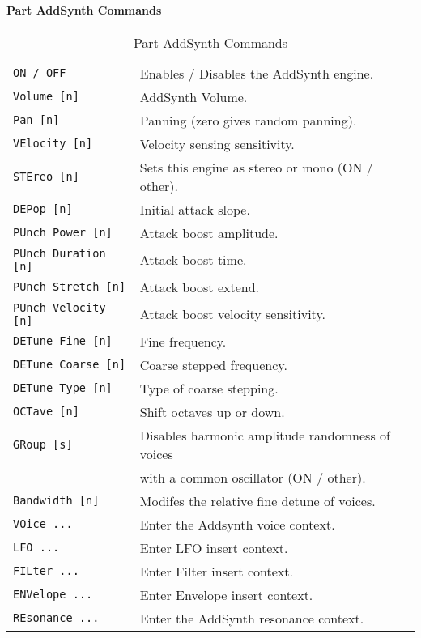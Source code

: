 \paragraph{Part AddSynth Commands}
\label{paragraph:command_line_part_addsynth_commands}
   \begin{table}[H]
      \centering
      \caption{Part AddSynth Commands}
      \label{table:yoshimi_part_addsynth_commands}
      \begin{tabular}{l l}
\texttt{ON / OFF} &
   Enables / Disables the AddSynth engine. \\
\texttt{Volume [n]} &
   AddSynth Volume.  \\
\texttt{Pan [n]} &
   Panning (zero gives random panning).\\
\texttt{VElocity [n]} &
   Velocity sensing sensitivity. \\
\texttt{STEreo [n]} &
   Sets this engine as stereo or mono (ON / other). \\
\texttt{DEPop [n]} &
   Initial attack slope.   \\
\texttt{PUnch Power [n]} &
   Attack boost amplitude. \\
\texttt{PUnch Duration [n]} &
   Attack boost time.   \\
\texttt{PUnch Stretch [n]} &
   Attack boost extend. \\
\texttt{PUnch Velocity [n]} &
   Attack boost velocity sensitivity.  \\
\texttt{DETune Fine [n]} &
   Fine frequency.   \\
\texttt{DETune Coarse [n]} &
   Coarse stepped frequency.  \\
\texttt{DETune Type [n]} &
   Type of coarse stepping.   \\
\texttt{OCTave [n]} &
   Shift octaves up or down.  \\
\texttt{GRoup [s]} &
   Disables harmonic amplitude randomness of voices \\
\texttt{ } &
             with a common oscillator (ON / other). \\
\texttt{Bandwidth [n]} &
   Modifes the relative fine detune of voices. \\
\texttt{VOice ...} &
   Enter the Addsynth voice context. \\
\texttt{LFO ...} &
   Enter LFO insert context.  \\
\texttt{FILter ...} &
   Enter Filter insert context.  \\
\texttt{ENVelope ...} &
   Enter Envelope insert context.   \\
\texttt{REsonance ...} &
   Enter the AddSynth resonance context. \\
      \end{tabular}
   \end{table}

